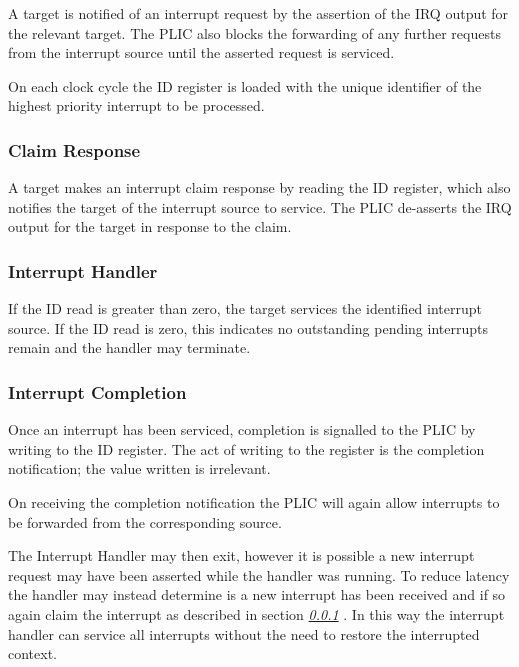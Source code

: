 A target is notified of an interrupt request by the assertion of the IRQ
output for the relevant target. The PLIC also blocks the forwarding of
any further requests from the interrupt source until the asserted
request is serviced.

On each clock cycle the ID register is loaded with the unique identifier
of the highest priority interrupt to be processed.

\subsubsection{Claim Response} \label{sec:claim-response}

A target makes an interrupt claim response by reading the ID register,
which also notifies the target of the interrupt source to service. The
PLIC de-asserts the IRQ output for the target in response to the claim.

\subsubsection{Interrupt Handler}

If the ID read is greater than zero, the target services the identified
interrupt source. If the ID read is zero, this indicates no outstanding
pending interrupts remain and the handler may terminate.

\subsubsection{Interrupt Completion}

Once an interrupt has been serviced, completion is signalled to the PLIC
by writing to the ID register. The act of writing to the register is the
completion notification; the value written is irrelevant.

On receiving the completion notification the PLIC will again allow
interrupts to be forwarded from the corresponding source.

The Interrupt Handler may then exit, however it is possible a new
interrupt request may have been asserted while the handler was running.
To reduce latency the handler may instead determine is a new interrupt
has been received and if so again claim the interrupt as described in
section \emph{\ref{sec:claim-response} }. In this
way the interrupt handler can service all interrupts without the need to
restore the interrupted context.